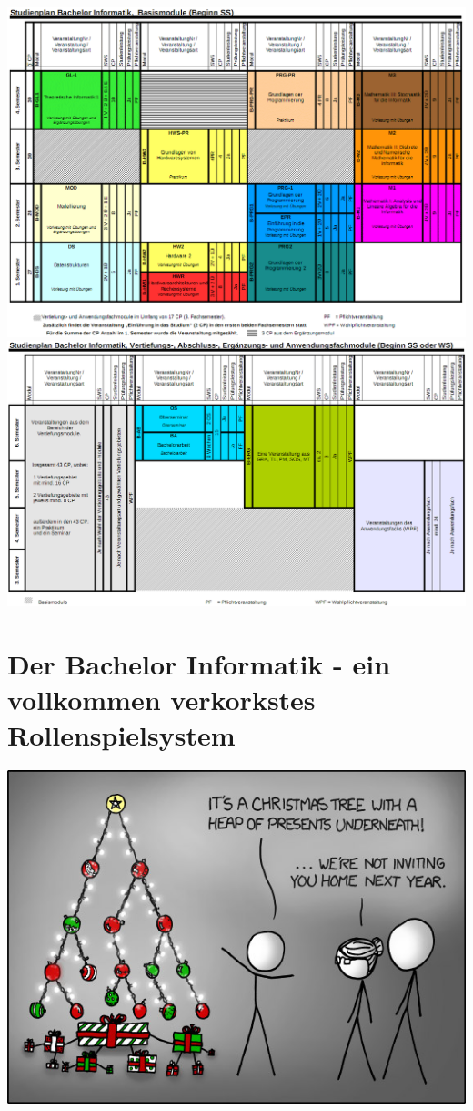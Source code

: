 \documentclass[a4paper,12pt]{scrartcl}
\newcommand{\spaltenanfang}{\begin{multicols}{2}}
\newcommand{\spaltenende}{\end{multicols}}
\begin{document}
\newpage
\includegraphics[width=18cm]{bitmaps/bachelor/basismodulebachelorSS}
\newline
\includegraphics[width=18cm]{bitmaps/bachelor/sonstigemodulebachelor}
\newpage
\section{Der Bachelor Informatik - ein vollkommen verkorkstes Rollenspielsystem }
\spaltenanfang

\spaltenende
\begin{center}
	\vspace{1cm}
	\includegraphics[scale=0.63]{comics/tree}
\end{center}
\newpage
\end{document}
